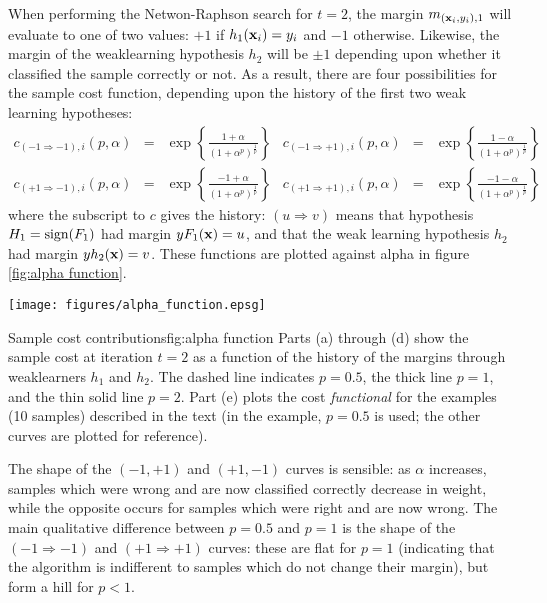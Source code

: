 When performing the Netwon-Raphson search for $t=2$, the margin
$m_{(\mathbf{x}_i, y_i), 1}$ will evaluate to one of two values: $+1$ if 
$h_1(\mathbf{x}_i) = y_i$ and $-1$ otherwise.  Likewise, the margin of the
weaklearning hypothesis $h_2$ will be $\pm 1$ depending upon whether
it classified the sample correctly or not.  As a result, there are
four possibilities for the sample cost function, depending upon the
history of the first two weak learning hypotheses:
%
\providecommand{\ra}{\Rightarrow}
\providecommand{\Pn}{(1 + \alpha^p)^{\frac{1}{p}}}
\begin{equation}
\begin{array}{rclrcl}
c_{(-1 \ra -1),i}(p,\alpha) & = & \exp \left\{ \frac{ 1 + \alpha}{\Pn} \right\} &
c_{(-1 \ra +1),i}(p,\alpha) & = & \exp \left\{ \frac{ 1 - \alpha}{\Pn} \right\} \\
c_{(+1 \ra -1),i}(p,\alpha) & = & \exp \left\{ \frac{-1 + \alpha}{\Pn} \right\} &
c_{(+1 \ra +1),i}(p,\alpha) & = & \exp \left\{ \frac{-1 - \alpha}{\Pn} \right\}
\end{array}
\end{equation}
%
where the subscript to $c$ gives the history: $(u \ra v)$ means that
hypothesis $H_1 = \mathrm{sign}(F_1)$ had margin $yF_1(\mathbf{x}) = u$, and that
the weak learning hypothesis $h_{2}$ had margin $yh_2(\mathbf{x}) = v$. These
functions are plotted against alpha in figure \ref{fig:alpha
function}.

\begin{linefigure}
\begin{center}
\hspace*{-1cm}\texttt{[image: figures/alpha\_function.epsg]}
\end{center}
\begin{capt}{Sample cost contributions}{fig:alpha function}
Parts (a) through (d) show the sample cost at iteration $t=2$ as a
function of the history of the margins through weaklearners $h_1$ and
$h_2$.  The dashed line indicates $p=0.5$, the thick line $p=1$, and
the thin solid line $p=2$.  Part (e) plots the cost \emph{functional}
for the examples (10 samples) described in the text (in the example,
$p=0.5$ is used; the other curves are plotted for reference).
\end{capt}
\end{linefigure}

The shape of the $(-1, +1)$ and $(+1, -1)$ curves is
sensible: as $\alpha$ increases, samples which were wrong and are now
classified correctly decrease in weight, while the opposite occurs for
samples which were right and are now wrong.  The main qualitative
difference between $p=0.5$ and $p=1$ is the shape of the $(-1 \ra -1)$
and $(+1 \ra +1)$ curves: these are flat for $p=1$ (indicating that
the algorithm is indifferent to samples which do not change their
margin), but form a hill for $p < 1$.

